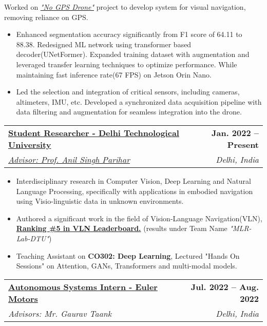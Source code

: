 \documentclass[letterpaper,11pt]{article}
\makeatletter
\newcommand{\resumeItem}[1]{
  \item\small{
    {#1 \vspace{-2pt}}
  }
}
\newcommand{\resumeSubheading}[4]{
  \vspace{-2pt}\item
    \begin{tabular*}{1.0\textwidth}[t]{l@{\extracolsep{\fill}}r}
      \textbf{#1} & \textbf{\small #2} \\
      \textit{\small#3} & \textit{\small #4} \\
    \end{tabular*}\vspace{-7pt}
}
\newcommand{\resumeItemListStart}{\begin{itemize}}
\newcommand{\resumeItemListEnd}{\end{itemize}\vspace{-5pt}}
\makeatother
\begin{document}
      {Worked on {\href{https://drive.google.com/drive/folders/16mT-9xbNTa2VwfsxXxXko2sw1qJXU5Fp}{\textit{"No GPS Drone"}}} project to develop system for visual navigation, removing reliance on GPS. }
      \vspace*{-2mm}
      \resumeItemListStart
        \resumeItem{Enhanced segmentation accuracy significantly from F1 score of 64.11 to 88.38. Redesigned ML network using transformer based decoder(UNetFormer). Expanded training dataset with augmentation and leveraged transfer learning techniques to optimize performance. While maintaining fast inference rate(67 FPS) on Jetson Orin Nano.}
        \resumeItem{Led the selection and integration of critical sensors, including cameras, altimeters, IMU, etc. Developed a synchronized data acquisition pipeline with data filtering and augmentation for seamless integration into the drone.}
        
    \resumeItemListEnd
    \vspace{-10pt}
       
    \resumeSubheading
      {\href{https://scholar.google.com/citations?user=JRr4wjoAAAAJ\&hl=en/}{Student Researcher - Delhi Technological University}}{Jan. 2022 -- Present}
      {\href{https://scholar.google.com/citations?user=JRr4wjoAAAAJ\&hl=en/}{Advisor: Prof. Anil Singh Parihar}}{Delhi, India}
      \resumeItemListStart

        \resumeItem{Interdisciplinary research in Computer Vision, Deep Learning and Natural Language Processing, specifically with applications in embodied navigation using Visio-linguistic data in unknown environments.}
        \resumeItem{Authored a significant work in the field of Vision-Language Navigation(VLN),  \href{https://eval.ai/web/challenges/challenge-page/97/leaderboard/270}{\textbf{Ranking \#5 in VLN Leaderboard.}} (results under Team Name \textit{"MLR-Lab-DTU"})}
        \resumeItem{Teaching Assistant on \textbf{CO302: Deep Learning}, Lectured "Hands On Sessions" on Attention, GANs, Transformers and multi-modal models.}
        
      \resumeItemListEnd
      \vspace{2pt}
   
    \resumeSubheading
      {\href{https://www.eulermotors.com/}{Autonomous Systems Intern - Euler Motors}}
      {Jul. 2022 -- Aug. 2022}
      {Advisors: Mr. Gaurav Taank}{Delhi, India}
\end{document}
